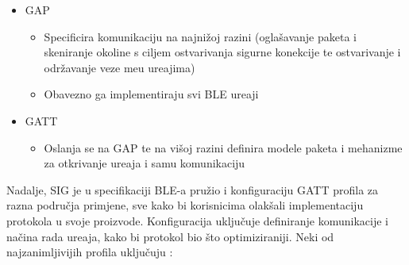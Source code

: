 \begin{itemize}
	\item GAP
	\begin{itemize}
		\item Specificira komunikaciju na najni\v{z}oj razini (ogla\v{s}avanje paketa i skeniranje okoline s ciljem ostvarivanja sigurne konekcije te ostvarivanje i odr\v{z}avanje veze me\dj u ure\dj ajima)
		\item Obavezno ga implementiraju svi BLE ure\dj aji
	\end{itemize}
	\item GATT
	\begin{itemize}
		\item Oslanja se na GAP te na vi\v{s}oj razini definira modele paketa i mehanizme za otkrivanje ure\dj aja i samu komunikaciju
	\end{itemize}
\end{itemize}

Nadalje, SIG je u specifikaciji BLE-a pru\v{z}io i konfiguraciju GATT profila za razna podru\v{c}ja primjene, sve kako bi korisnicima olak\v{s}ali implementaciju protokola u svoje proizvode. Konfiguracija uklju\v{c}uje definiranje komunikacije i na\v{c}ina rada ure\dj aja, kako bi protokol bio \v{s}to optimiziraniji. Neki od najzanimljivijih profila uklju\v{c}uju \cite{ble_profiles}: 


